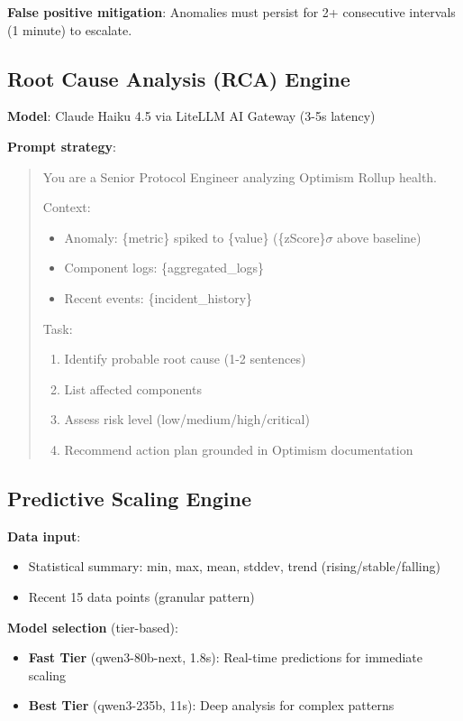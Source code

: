 \documentclass[11pt,a4paper]{article}
\begin{document}
\textbf{False positive mitigation}: Anomalies must persist for 2+ consecutive intervals (1 minute) to escalate.

\subsection{Root Cause Analysis (RCA) Engine}

\textbf{Model}: Claude Haiku 4.5 via LiteLLM AI Gateway (3-5s latency)

\textbf{Prompt strategy}:
\begin{quote}
You are a Senior Protocol Engineer analyzing Optimism Rollup health.

Context:
\begin{itemize}
    \item Anomaly: \{metric\} spiked to \{value\} (\{zScore\}$\sigma$ above baseline)
    \item Component logs: \{aggregated\_logs\}
    \item Recent events: \{incident\_history\}
\end{itemize}

Task:
\begin{enumerate}
    \item Identify probable root cause (1-2 sentences)
    \item List affected components
    \item Assess risk level (low/medium/high/critical)
    \item Recommend action plan grounded in Optimism documentation
\end{enumerate}
\end{quote}

\subsection{Predictive Scaling Engine}

\textbf{Data input}:
\begin{itemize}
    \item Statistical summary: min, max, mean, stddev, trend (rising/stable/falling)
    \item Recent 15 data points (granular pattern)
\end{itemize}

\textbf{Model selection} (tier-based):
\begin{itemize}
    \item \textbf{Fast Tier} (qwen3-80b-next, 1.8s): Real-time predictions for immediate scaling
    \item \textbf{Best Tier} (qwen3-235b, 11s): Deep analysis for complex patterns
\end{itemize}
\end{document}
